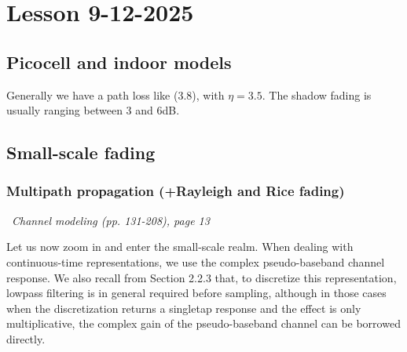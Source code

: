 \documentclass[a4paper, 12pt]{book}
\begin{document}
\setcounter{chapter}{10}
\chapter{Lesson 9-12-2025}
\section{Picocell and indoor models}

Generally we have a path loss like (3.8), with $\eta=3.5$.
The shadow fading is usually ranging between 3 and 6dB.

\section{Small-scale fading}

\subsection{Multipath propagation (+Rayleigh and Rice fading)}

\begin{center}
\end{center}

\begin{yellowbox}
\faBook\ \textit{Channel modeling (pp. 131-208), page 13}

Let us now zoom in and enter the small-scale realm. When dealing with continuous-time representations, we use the complex \textcolor{green!60!black}{pseudo-baseband channel response}. We also recall from Section 2.2.3 that, \textcolor{green!60!black}{to discretize this representation}, lowpass filtering is in general required before sampling, although in those cases when the discretization returns a singletap response and the effect is only multiplicative, the complex gain of the pseudo-baseband channel can be borrowed directly.
\end{yellowbox}
\end{document}
